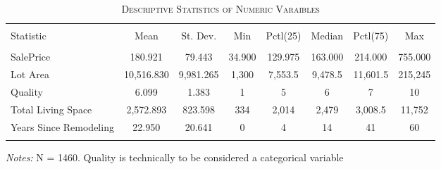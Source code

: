 \documentclass[a4paper]{article}
\begin{document}
\begin{table}[!htbp] 
\begin{adjustwidth}{-0cm}{-0cm}
\begin{threeparttable}
\small
\captionsetup{font=small, justification=raggedright,singlelinecheck=false}
\caption{\textsc{Descriptive Statistics of Numeric Varaibles}}
\centering 
  \label{}   
\begin{tabular}{@{\extracolsep{1pt}}lccccccc} 
\\[-5ex]\hline 
\hline \\[-1.8ex] 
Statistic & \multicolumn{1}{c}{Mean} & \multicolumn{1}{c}{St. Dev.} & \multicolumn{1}{c}{Min} & \multicolumn{1}{c}{Pctl(25)} & \multicolumn{1}{c}{Median} & \multicolumn{1}{c}{Pctl(75)} & \multicolumn{1}{c}{Max} \\ 
\hline \\[-1.8ex] 
SalePrice & 180.921 & 79.443 & 34.900 & 129.975 & 163.000 & 214.000 & 755.000 \\ 
Lot Area & 10,516.830 & 9,981.265 & 1,300 & 7,553.5 & 9,478.5 & 11,601.5 & 215,245 \\ 
Quality & 6.099 & 1.383 & 1 & 5 & 6 & 7 & 10 \\ 
Total Living Space & 2,572.893 & 823.598 & 334 & 2,014 & 2,479 & 3,008.5 & 11,752 \\ 
Years Since Remodeling & 22.950 & 20.641 & 0 & 4 & 14 & 41 & 60 \\ 
\hline \\[-3.5ex] 
\end{tabular} 
\begin{tablenotes}
      \small
      \item\textit{Notes:} N = 1460. Quality is technically to be considered a categorical variable
    \end{tablenotes}
\end{threeparttable}
\end{adjustwidth}
\end{table}
\end{document}
